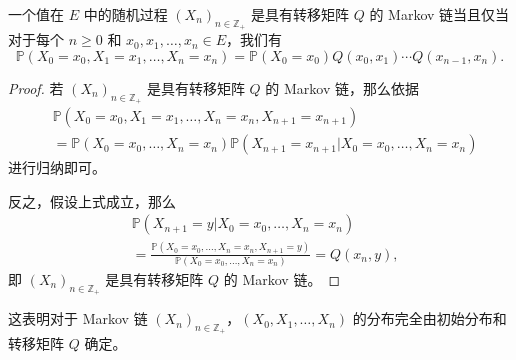\documentclass[fontset=none]{Notes}
\begin{document}
\begin{proposition}\label{prop:law of X0 to Xn}
  一个值在 $E$ 中的随机过程 $(X_n)_{n\in \mathbb{Z}_+}$ 是具有转移矩阵 $Q$ 的 Markov 链当且仅当
  对于每个 $n\geq 0$ 和 $x_0,x_1,\dots,x_n\in E$，我们有
  \[
    \mathbb{P}(X_0=x_0,X_1=x_1,\dots,X_n=x_n)=\mathbb{P}(X_0=x_0)
    Q(x_0,x_1)\cdots Q(x_{n-1},x_n).
  \]
\end{proposition}
\begin{proof}
  若 $(X_n)_{n\in \mathbb{Z}_+}$ 是具有转移矩阵 $Q$ 的 Markov 链，那么依据
  \begin{align*}
    &\mathbb{P}(X_0=x_0,X_1=x_1,\dots,X_n=x_n,X_{n+1}=x_{n+1})\\
    &=\mathbb{P}(X_0=x_0,\dots,X_n=x_n)\mathbb{P}(X_{n+1}=x_{n+1}|X_0=x_0,\dots,X_n=x_n)
  \end{align*}
  进行归纳即可。

  反之，假设上式成立，那么
  \begin{align*}
    &\mathbb{P}(X_{n+1}=y|X_0=x_0,\dots,X_n=x_n)\\
    &=\frac{\mathbb{P}(X_0=x_0,\dots,X_n=x_n,X_{n+1}=y)}{\mathbb{P}(X_0=x_0,\dots,X_n=x_n)}
    =Q(x_n,y),
  \end{align*}
  即 $(X_n)_{n\in \mathbb{Z}_+}$ 是具有转移矩阵 $Q$ 的 Markov 链。
\end{proof}

\begin{remark}
  这表明对于 Markov 链 $(X_n)_{n\in \mathbb{Z}_+}$，$(X_0,X_1,\dots,X_n)$
  的分布完全由初始分布和转移矩阵 $Q$ 确定。
\end{remark}
\end{document}
